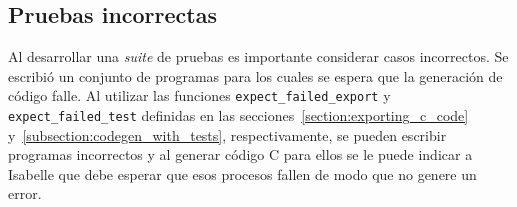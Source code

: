 \begin{comment}
\begin{figure}
\begin{lstlisting}[mathescape=true]
  fun generate_c_test_code (SOME (code,test_code)) rel_path name thy =
    let
      val code = code |> String.implode
      val test_code = test_code |> String.implode
    in
      if rel_path="" orelse name="" then
        (writeln (code ^ " <rem last line> " ^ test_code); thy)
      else let
        val base_path = Resources.master_directory thy
        val rel_path = Path.explode rel_path
        val name_path = Path.basic name |> Path.ext "c"

        val abs_path = Path.appends [base_path, rel_path, name_path]
        val abs_path = Path.implode abs_path

        val _ = writeln ("Writing to file " ^ abs_path)

        val os = TextIO.openOut abs_path;
        val _ = TextIO.output (os, code);
        val _ = TextIO.flushOut os;
        val _ = TextIO.closeOut os;

        val _ = Isabelle_System.bash ("sed -i '$\mathtt{\$}$d ' " ^ abs_path);

        val os = TextIO.openAppend abs_path;
        val _ = TextIO.output (os, test_code);
        val _ = TextIO.flushOut os;
        val _ = TextIO.closeOut os;
      in thy end
    end

  | generate_c_test_code NONE _ _ _ =
      error "Invalid program or failed execution"

  fun expect_failed_test (SOME _) = error "Expected Failed test"
    | expect_failed_test NONE = ()
\end{lstlisting}

\caption{Generación de código en C con pruebas}
\label{fig:generate_c_test_code}
\end{figure}
\end{comment}


\subsection{Pruebas incorrectas}

Al desarrollar una \textit{suite} de pruebas es importante considerar casos incorrectos.
Se escribió un conjunto de programas para los cuales se espera que la generación de código falle.
Al utilizar las funciones \verb|expect_failed_export| y \verb|expect_failed_test| definidas en las secciones~\ref{section:exporting_c_code} y~\ref{subsection:codegen_with_tests}, respectivamente, se pueden escribir programas incorrectos y al generar código C para ellos se le puede indicar a Isabelle que debe esperar que esos procesos fallen de modo que no genere un error.

